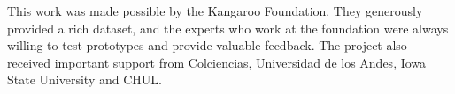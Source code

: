 \documentclass[twocolumn]{svjour3}
\begin{document}
\begin{acknowledgements}

This work was made possible by the Kangaroo Foundation. They generously provided a rich dataset, and the experts who work at the foundation were always willing to test prototypes and provide valuable feedback. The project also received important support from Colciencias, Universidad de los Andes, Iowa State University and CHUL.

\end{acknowledgements}

 

\end{document}
